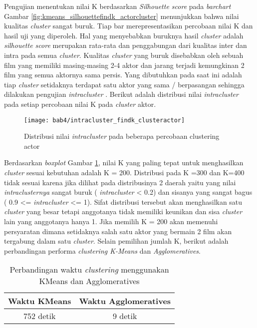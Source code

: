 Pengujian menentukan nilai K berdasarkan \textit{Silhouette score} pada \textit{barchart} Gambar \ref{fig:kmeans_silhouettefindk_actorcluster} menunjukkan bahwa nilai kualitas \textit{cluster} sangat buruk. Tiap bar merepresentasikan percobaan nilai K dan hasil uji yang diperoleh. Hal yang menyebabkan buruknya hasil \textit{cluster} adalah \textit{silhouette score} merupakan rata-rata dan penggabungan dari kualitas inter dan intra pada semua \textit{cluster}.  Kualitas \textit{cluster} yang buruk disebabkan oleh sebuah film yang memiliki masing-masing 2-4 aktor dan jarang terjadi kemungkinan 2 film yang semua aktornya sama persis. Yang dibutuhkan pada saat ini adalah tiap \textit{cluster} setidaknya terdapat satu aktor yang sama / berpasangan sehingga dilakukan pengujian \textit{intracluster} . Berikut adalah distribusi nilai \textit{intracluster} pada setiap percobaan nilai K pada \textit{cluster} aktor.


\begin{figure}[H]
	\centering  
	\texttt{[image: bab4/intracluster\_findk\_clusteractor]}   
	\caption{Distribusi nilai \textit{intracluster} pada beberapa percobaan clustering actor }	\label{fig:intracluster_findk_clusteractor} 
\end{figure}


Berdasarkan \textit{boxplot} Gambar \ref{fig:intracluster_findk_clusteractor}, nilai K yang paling tepat untuk menghasilkan \textit{cluster} sesuai kebutuhan adalah K = 200. Distribusi pada K =300 dan K=400 tidak sesuai karena jika dilihat pada distribusinya 2 daerah yaitu yang nilai \textit{intraclusternya} sangat buruk ( \textit{intracluster} < 0.2) dan sisanya yang sangat bagus (  0.9 <= \textit{intracluster} <= 1). Sifat distribusi tersebut akan menghasilkan satu \textit{cluster} yang besar tetapi anggotanya tidak memiliki keunikan dan sisa \textit{cluster} lain yang anggotanya hanya 1. Jika memilih K = 200 akan memenuhi persyaratan dimana setidaknya salah satu aktor yang bermain 2 film akan tergabung dalam satu \textit{cluster}. Selain pemilihan jumlah K, berikut adalah perbandingan performa \textit{clustering K-Means} dan \textit{Agglomeratives}.



\begin{table}[H]
\centering
\caption{Perbandingan waktu \textit{clustering} menggunakan KMeans dan Agglomeratives}
\begin{tabular}{|c|c|}
\hline 
 Waktu KMeans & Waktu Agglomeratives \\ 
\hline 
752 detik & 9 detik \\ 
\hline 
\end{tabular} 
\label{tab:perbandinganwaktu_clustering}
\end{table}


